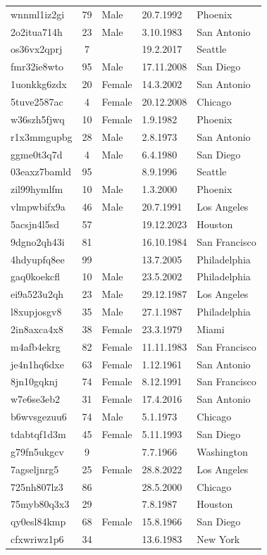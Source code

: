 \documentclass[a4paper, 12pt, notitlepage]{report}
\begin{document}
\begin{longtable}{l c l l l}
        wnnml1iz2gi & 79 & Male & 20.7.1992 & Phoenix \\
        2o2itua714h & 23 & Male & 3.10.1983 & San Antonio \\
        os36vx2qprj & 7 &  & 19.2.2017 & Seattle \\
        fmr32ie8wto & 95 & Male & 17.11.2008 & San Diego \\
        1uonkkg6zdx & 20 & Female & 14.3.2002 & San Antonio \\
        5tuve2587ac & 4 & Female & 20.12.2008 & Chicago \\
        w36szh5fjwq & 10 & Female & 1.9.1982 & Phoenix \\
        r1x3mmgupbg & 28 & Male & 2.8.1973 & San Antonio \\
        ggme0t3q7d & 4 & Male & 6.4.1980 & San Diego \\
        03eaxz7bamld & 95 &  & 8.9.1996 & Seattle \\
        zil99hymlfm & 10 & Male & 1.3.2000 & Phoenix \\
        vlmpwbifx9a & 46 & Male & 20.7.1991 & Los Angeles \\
        5acsjn4l5sd & 57 &  & 19.12.2023 & Houston \\
        9dgno2qh43i & 81 &  & 16.10.1984 & San Francisco \\
        4hdyupfq8ee & 99 &  & 13.7.2005 & Philadelphia \\
        gaq0koekcfl & 10 & Male & 23.5.2002 & Philadelphia \\
        ei9a523u2qh & 23 & Male & 29.12.1987 & Los Angeles \\
        l8xupjosgv8 & 35 & Male & 27.1.1987 & Philadelphia \\
        2in8axca4x8 & 38 & Female & 23.3.1979 & Miami \\
        m4afb4ekrg & 82 & Female & 11.11.1983 & San Francisco \\
        je4n1hq6dxe & 63 & Female & 1.12.1961 & San Antonio \\
        8jn10gqknj & 74 & Female & 8.12.1991 & San Francisco \\
        w7e6se3eb2 & 31 & Female & 17.4.2016 & San Antonio \\
        b6wvsgezuu6 & 74 & Male & 5.1.1973 & Chicago \\
        tdabtqf1d3m & 45 & Female & 5.11.1993 & San Diego \\
        g79fn5ukgcv & 9 &  & 7.7.1966 & Washington \\
        7agseljnrg5 & 25 & Female & 28.8.2022 & Los Angeles \\
        725nh807lz3 & 86 &  & 28.5.2000 & Chicago \\
        75myb80q3x3 & 29 &  & 7.8.1987 & Houston \\
        qy0esl84kmp & 68 & Female & 15.8.1966 & San Diego \\
        cfxwriwz1p6 & 34 &  & 13.6.1983 & New York \\
    \end{longtable}
\end{document}

